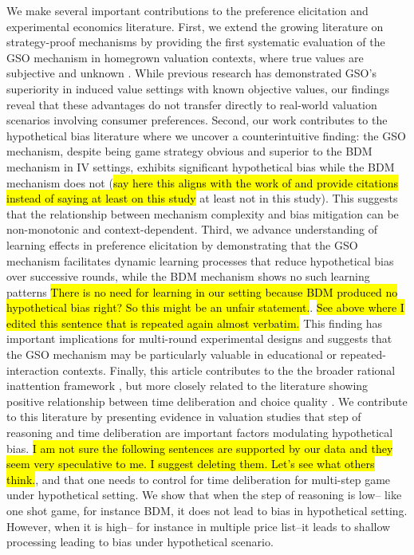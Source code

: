 \documentclass[12pt]{article}
\begin{document}
We make several important contributions to the preference elicitation and experimental economics literature. First, we extend the growing literature on strategy-proof mechanisms by providing the first systematic evaluation of the GSO mechanism in homegrown valuation contexts, where true values are subjective and unknown \citep{li_obviously_2017, pycia_theory_2023, chakraborty_future_2025}. While previous research has demonstrated GSO's superiority in induced value settings with known objective values, our findings reveal that these advantages do not transfer directly to real-world valuation scenarios involving consumer preferences. Second, our work contributes to the hypothetical bias literature \citep{penn2018understanding, cummings1999unbiased, loomis_whats_2011, fang_use_2021, list2001explicit, grebitus2013explaining} where we uncover a counterintuitive finding: the GSO mechanism, despite being game strategy obvious and superior to the BDM mechanism in IV settings, exhibits significant hypothetical bias while the BDM mechanism does not (\hl{say here this aligns with the work of and provide citations instead of saying at least on this study} at least not in this study). This suggests that the relationship between mechanism complexity and bias mitigation can be non-monotonic and context-dependent. Third, we advance understanding of learning effects in preference elicitation \citep{drichoutis2011role, canavari2019run} by demonstrating that the GSO mechanism facilitates dynamic learning processes that reduce hypothetical bias over successive rounds, while the BDM mechanism shows no such learning patterns \hl{There is no need for learning in our setting because BDM produced no hypothetical bias right? So this might be an unfair statement.}. \hl{See above where I edited this sentence that is repeated again almost verbatim.} This finding has important implications for multi-round experimental designs and suggests that the 
GSO mechanism may be particularly valuable in educational or repeated-interaction contexts.
Finally, this article contributes to the the broader rational inattention framework \citep{sims2003implications, mackowiak2023rational}, but more closely related to the literature showing positive relationship between time deliberation and choice quality \citep{alaoui2016endogenous,alos2021cognitive}.  
We contribute to this literature by presenting evidence in valuation studies that step of reasoning and time deliberation are important factors modulating hypothetical bias. \hl{I am not sure the following sentences are supported by our data and they seem very speculative to me. I suggest deleting them. Let's see what others think.}, and that one needs to control for time deliberation for multi-step game under hypothetical setting. We show that when the step of reasoning is low-- like one shot game, for instance BDM, it does not lead to bias in hypothetical setting. However, when it is high-- for instance in multiple price list--it leads to shallow processing leading to bias under hypothetical scenario. 
\end{document}
